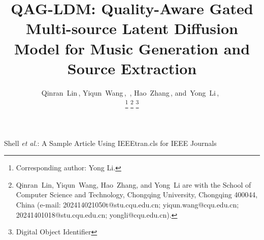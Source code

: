 \documentclass[lettersize,journal]{IEEEtran}
\begin{document}
\title{QAG-LDM: Quality-Aware Gated Multi-source Latent Diffusion Model for Music Generation and Source Extraction}

\author{Qinran~Lin\,,
        Yiqun~Wang\,,~,
        Hao~Zhang\,,
        and~Yong~Li\,,~%


\thanks{Corresponding author: Yong Li.}
\thanks{Qinran~Lin, Yiqun~Wang, Hao~Zhang, and Yong~Li are with the School of Computer Science and Technology, Chongqing University, Chongqing 400044, China (e-mail: 202414021050t@stu.cqu.edu.cn; yiqun.wang@cqu.edu.cn; 20241401018@stu.cqu.edu.cn; yongli@cqu.edu.cn).}%
\thanks{Digital Object Identifier }
}
%
{Shell \MakeLowercase{\textit{et al.}}: A Sample Article Using IEEEtran.cls for IEEE Journals}
\end{document}

